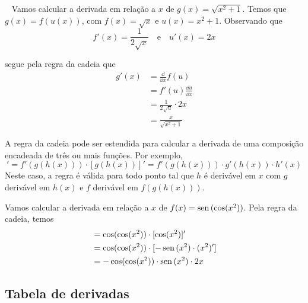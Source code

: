\cleardoublepage\documentclass[../main.tex]{subfiles}
\begin{document}
\begin{ex}~
  Vamos calcular a derivada em relação a $x$ de $g(x) = \sqrt{x^2+1}$. Temos que $g(x) = f(u(x))$, com $f(x) = \sqrt{x}$ e $u(x) = x^2+1$. Observando que
  \begin{equation}
    f'(x) = \frac{1}{2\sqrt{x}}\quad\text{e}\quad u'(x)=2x
  \end{equation}
  \begin{solution}
  segue pela regra da cadeia que
  \begin{align*}
    g'(x) &= \frac{\dd}{\dd x}f(u) \\
          &= f'(u)\frac{\dd u}{\dd x} \\
          &= \frac{1}{2\sqrt{u}}\cdot 2x \\
          &= \frac{x}{\sqrt{x^2+1}}
  \end{align*}
  \end{solution}
\end{ex}

A regra da cadeia pode ser estendida para calcular a derivada de uma composição encadeada de três ou mais funções. Por exemplo,
\begin{equation}
  [f(g(h(x)))]' = f'(g(h(x)))\cdot[g(h(x))]' = f'(g(h(x)))\cdot g'(h(x))\cdot h'(x)
\end{equation}
Neste caso, a regra é válida para todo ponto tal que $h$ é derivável em $x$ com $g$ derivável em $h(x)$ e $f$ derivável em $f(g(h(x)))$.

\begin{ex}
  Vamos calcular a derivada em relação a $x$ de $f(x) = \operatorname{sen}\,(\cos(x^2))$. Pela regra da cadeia, temos
  \begin{align*}
    [\sen(\cos(x^2))] &= \cos(\cos(x^2))\cdot[\cos(x^2)]' \\
                    &= \cos(\cos(x^2))\cdot [-\sen(x^2)\cdot (x^2)'] \\
                    &= -\cos(\cos(x^2))\cdot\sen(x^2)\cdot 2x
  \end{align*}
\end{ex}

\subsection{Tabela de derivadas}
\end{document}
